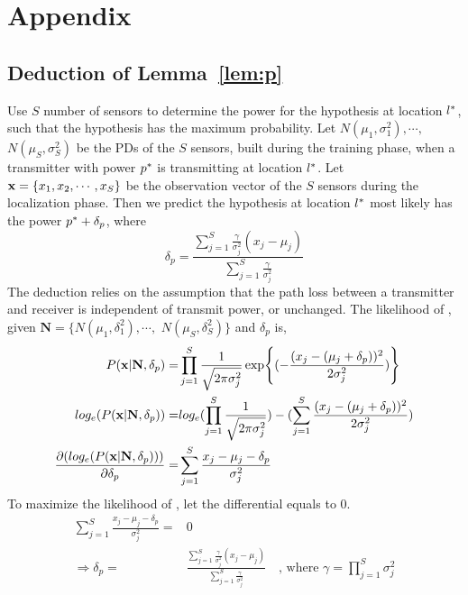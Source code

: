 \chapter{Appendix}
\section{Deduction of Lemma~\ref{lem:p}}
\label{appen:ipsn}

Use $S$ number of sensors to determine the power for the hypothesis at location $l^*$, such that the hypothesis has the maximum probability.
Let $N(\mu_1, \sigma_1^2), \cdots, $ $N(\mu_S, \sigma_S^2)$ be the PDs of the $S$ sensors, built during the training phase, when a transmitter with power $p^*$ is transmitting at location $l^*$. 
Let $\mathbf{x} = \{x_1, x_2, \cdots, x_S\}$ be the observation vector of the $S$ sensors during the localization phase. 
Then we predict the hypothesis at location $l^*$ most likely has the power $p^* + \delta_p$, where 
$$\delta_p = \frac{\sum_{j=1}^{S} \frac{\gamma}{\sigma_j^2} (x_j - \mu_j)}{\sum_{j=1}^{S} \frac{\gamma}{\sigma_j^2}}$$
The deduction relies on the assumption that the path loss between a transmitter and receiver is independent of transmit power, or unchanged. The likelihood of \vx, given  $ \mathbf{N} = \{ N(\mu_1, \delta_1^2), \cdots, $ $N(\mu_S, \delta_S^2) \} $ and $\delta_p$ is,
\begin{align*}
P(\mathbf{x} | \mathbf{N}, \delta_p)        = & \prod_{j=1}^{S} \frac{1}{\sqrt{2\pi\sigma_j^2}} \exp{(- \frac{(x_j - (\mu_j + \delta_p))^2}{2\sigma_j^2})} \\
log_e(P(\mathbf{x} | \mathbf{N}, \delta_p)) = & log_e(\prod_{j=1}^{S}\frac{1}{\sqrt{2\pi\sigma_j^2}}) - (\sum_{j=1}^{S} \frac{(x_j - (\mu_j + \delta_p))^2}{2\sigma_j^2})  \\
\frac{\partial (log_e(P(\mathbf{x} | \mathbf{N}, \delta_p))) }{\partial \delta_p} = & \sum_{j=1}^{S} \frac{x_j - \mu_j - \delta_p}{\sigma_j^2}
\end{align*}
To maximize the likelihood of \vx, let the differential equals to 0.
\begin{align*}
\sum_{j=1}^{S} \frac{x_j - \mu_j - \delta_p}{\sigma_j^2} = & 0 \\
\Rightarrow \delta_p= & \frac{\sum_{j=1}^{S} \frac{\gamma}{\sigma_j^2} (x_j - \mu_j)}{\sum_{j=1}^{S} \frac{\gamma}{\sigma_j^2}}  \ \ \ \text{ , where } \gamma = \prod_{j=1}^{S}\sigma_j^2 \\
\end{align*}
